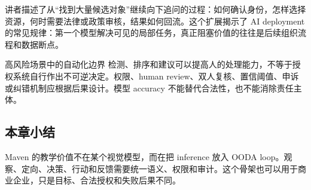 讲者描述了从“找到大量候选对象”继续向下追问的过程：如何确认身份，怎样选择资源，何时需要法律或政策审核，结果如何回流。这个扩展揭示了 AI deployment 的常见规律：第一个模型解决可见的局部任务，真正阻塞价值的往往是后续组织流程和数据断点。

\begin{warningbox}{高风险场景中的自动化边界}
检测、排序和建议可以提高人的处理能力，不等于授权系统自行作出不可逆决定。权限、human review、双人复核、置信阈值、申诉或纠错机制应根据后果设计。模型 accuracy 不能替代合法性，也不能消除责任主体。
\end{warningbox}

\subsection{本章小结}

Maven 的教学价值不在某个视觉模型，而在把 inference 放入 OODA loop。观察、定向、决策、行动和反馈需要统一语义、权限和审计。这个骨架也可以用于商业企业，只是目标、合法授权和失败后果不同。

